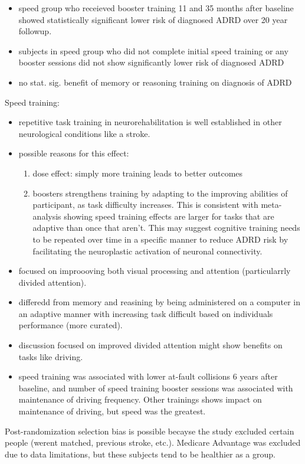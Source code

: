 \documentclass[11pt]{article}
\begin{document}
\begin{itemize}
\item speed group who receieved booster training 11 and 35 months after baseline showed statistically significant lower risk of diagnosed ADRD over 20 year followup.
\item subjects in speed group who did not complete initial speed training or any booster sessions did not show significantly lower risk of diagnosed ADRD
\item no stat. sig. benefit of memory or reasoning training on diagnosis of ADRD
\end{itemize}

Speed training:
\begin{itemize}
\item repetitive task training in neurorehabilitation is well established in other neurological conditions like a stroke.
\item possible reasons for this effect:
\begin{enumerate}
\item dose effect: simply more training leads to better outcomes
\item boosters strengthens training by adapting to the improving abilities of participant, as task difficulty increases. This is consistent with meta-analysis showing speed training effects are larger for tasks that are adaptive than once that aren't. This may suggest cognitive training needs to be repeated over time in a specific manner to reduce ADRD risk by facilitating the neuroplastic activation of neuronal connectivity.
\end{enumerate}
\item focused on improooving both visual processing and attention (particularrly divided attention).
\item differedd from memory and reasining by being administered on a computer in an adaptive manner with increasing task difficult based on individuals performance (more curated).
\item discussion focused on improved divided attention might show benefits on tasks like driving.
\item speed training was associated with lower at-fault collisions 6 years after baseline, and number of speed training booster sessions was associated with maintenance of driving frequency. Other trainings shows impact on maintenance of driving, but speed was the greatest.
\end{itemize}


Post-randomization selection bias is possible becayse the study excluded certain people (werent matched, previous stroke, etc.). Medicare Advantage was excluded due to data limitations, but these subjects tend to be healthier as a group.
\end{document}
